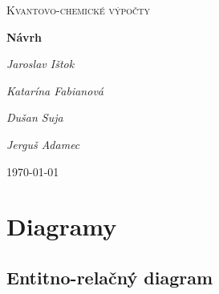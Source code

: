 \documentclass[12pt,a4paper]{article}
\begin{document}
\begin{titlepage}
	\centering
	\par\vspace{1cm}
	{\scshape\LARGE Kvantovo-chemické výpočty \par}
	\vspace{1cm}

	{\huge\bfseries Návrh  \par}
	\vspace{2cm}
	{\Large\itshape Jaroslav Ištok \par}
	{\Large\itshape Katarína Fabianová \par}
	{\Large\itshape Dušan Suja \par}
	{\Large\itshape Jerguš Adamec \par}
	\vfill
	{\large \today\par}
\end{titlepage}

\pagebreak

\tableofcontents

\pagebreak



\section{Diagramy}

\subsection{Entitno-relačný diagram}
\end{document}
